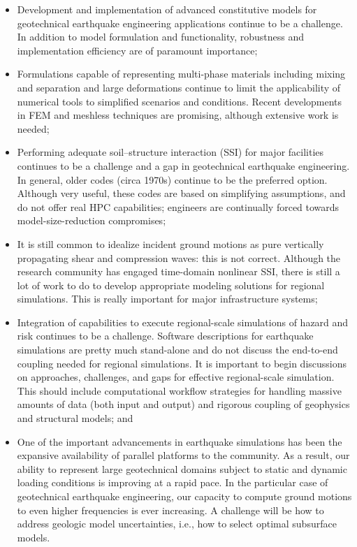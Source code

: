 \begin{itemize}

\item Development and implementation of advanced constitutive models for geotechnical earthquake engineering applications continue to be a challenge. In addition to model formulation and functionality, robustness and implementation efficiency are of paramount importance;  

\item Formulations capable of representing multi-phase materials including mixing and separation and large deformations continue to limit the applicability of numerical tools to simplified scenarios and conditions. Recent developments in FEM and meshless techniques are promising, although extensive work is needed;

\item Performing adequate soil--structure interaction (SSI) for major facilities continues to be a challenge and a gap in geotechnical earthquake engineering. In general, older codes (circa 1970s) continue to be the preferred option. Although very useful, these codes are based on simplifying assumptions, and do not offer real HPC capabilities; engineers are continually forced towards model-size-reduction compromises;

\item It is still common to idealize incident ground motions as pure vertically propagating shear and compression waves: this is not correct. Although the research community has engaged time-domain nonlinear SSI, there is still a lot of work to do to develop appropriate modeling solutions for regional simulations. This is really important for major infrastructure systems;

\item Integration of capabilities to execute regional-scale simulations of hazard and risk continues to be a challenge. Software descriptions for earthquake simulations are pretty much stand-alone and do not discuss the end-to-end coupling needed for regional simulations. It is important to begin discussions on approaches, challenges, and gaps for effective regional-scale simulation. This should include computational workflow strategies for handling massive amounts of data (both input and output) and rigorous coupling of geophysics and structural models; and

\item One of the important advancements in earthquake simulations has been the expansive availability of parallel platforms to the community. As a result, our ability to represent large geotechnical domains subject to static and dynamic loading conditions is improving at a rapid pace. In the particular case of geotechnical earthquake engineering, our capacity to compute ground motions to even higher frequencies is ever increasing. A challenge will be how to address geologic model uncertainties, i.e., how to select optimal subsurface models.

\end{itemize}

